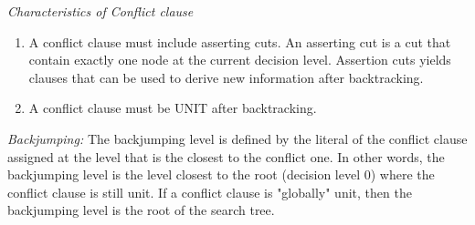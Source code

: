 \documentclass[a4paper,conference]{llncs}
\begin{document}
\textit{Characteristics of Conflict clause}
\begin{enumerate}
\item A conflict clause must include asserting cuts. An asserting cut is a cut
that contain exactly one node at the current decision level. Assertion cuts yields 
clauses that can be used to derive new information after backtracking.

\item A conflict clause must be UNIT after backtracking. 


\end{enumerate}

\textit{Backjumping:}
The backjumping level is defined by the literal of the conflict clause assigned
at the level that is the closest to the conflict one. In other words, the
backjumping level is the level closest to the root (decision level 0)  where the
conflict clause is still unit. If a conflict clause is "globally"  unit, then
the backjumping level is the root of the search tree.
\end{document}
